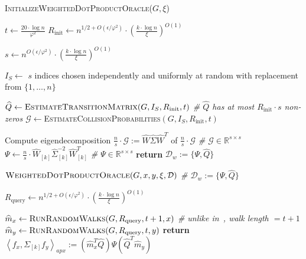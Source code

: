 \documentclass[letterpaper,11pt]{article}
\newcommand{\Q}{\widehat{Q}}
\newcommand{\m}{\widehat{m}}
\newcommand{\cD}{\mathcal{D}}
\newcommand{\G}{\mathcal{G}}
\newcommand{\R}{\mathbb{R}}
\theoremstyle{plain}
\theoremstyle{definition}
\theoremstyle{remark}
\newcommand{\adp}[1]
  {\ensuremath{\left\langle #1 \right\rangle_{\scriptscriptstyle apx}}}
\newcommand{\return}{\textbf{return }}
\begin{document}
\begin{algorithm}[H]
	\caption{\textsc{InitializeWeightedDotProductOracle($G,\xi$)}  
 } \label{alg:LearnEmbedding-tt}
\label{alg:LearnEmbedding}
\begin{algorithmic}[1]
	\STATE $t\gets \frac{20\cdot \log n}{\varphi^2}$	
\STATE $R_{\text{init}}\gets n^{1/2 + O(\epsilon / \varphi^2)} \cdot  \left(\frac{k\cdot \log n}{\xi}\right)^{O(1)}$	
	
	\STATE $s\gets n^{O(\epsilon / \varphi^2)} \cdot \left(\frac{k\cdot \log n}{\xi}\right)^{O(1)}$ \label{ln:sets} 
	
	\STATE  $I_S\gets $ $s$ indices chosen independently and uniformly at random with replacement from $\{1,\ldots,n\}$ \label{ln:sample}
	
\STATE ${\Q} \gets \textsc{EstimateTransitionMatrix}(G,I_S,R_{\text{init}},t)$  \textit{\qquad   \# $\Q$ has at most $R_{\text{init}}\cdot s$ non-zeros \label{ln:setQi}}
	\STATE $\G\gets$\textsc{EstimateCollisionProbabilities}$(G,I_S,R_{\text{init}},t)$ \label{ln:setG}

	\STATE Compute  eigendecomposition $\frac{n}{s}\cdot\G:=\widehat{W}\widehat{\Sigma} \widehat{W}^T$  of $\frac{n}{s}\cdot\G$ \textit{\qquad\qquad \qquad \qquad\qquad \# $\G\in \R^{s\times s}$ \label{ln:svdG}}
	\STATE $\Psi\gets \frac{n}{s}\cdot\widehat{W}_{[k]}\widehat{\Sigma}_{[k]}^{-2} \widehat{W}_{[k]}^T$ \textit{\qquad \qquad\qquad \qquad\qquad \qquad\qquad \qquad\qquad \qquad \qquad \qquad \# $\Psi\in\R^{s\times s}$} 
	\STATE \return   $\cD_w:=\{\Psi,\Q\}$
\end{algorithmic}
\end{algorithm}

\begin{algorithm}[H]
	\caption{$\textsc{WeightedDotProductOracle}(G,x,y,  \xi, \mathcal{D})$  \textit{\qquad \qquad  \# $\mathcal{D}_w:=\{\Psi,\Q\}$}
}
\label{alg:weighted-dot}
\begin{algorithmic}[1]
	\STATE $R_{\text{query}}\gets n^{1/2 + O(\epsilon / \varphi^2)} \cdot  \left(\frac{k\cdot \log n}{\xi}\right)^{O(1)}$
				
		\STATE ${\m_x\gets \textsc{RunRandomWalks}(G,R_{\text{query}},t+1,x)}$
		 \textit{\quad \# unlike in~\cite{GluchKLMS21},  walk length  $=t+1$}
		\STATE ${\m_y\gets \textsc{RunRandomWalks}(G,R_{\text{query}},t,y)}$ 
	\STATE  \return $\adp{f_{x},\Sigma_{[k]} f_y}:=(\m_x^T \Q) \Psi (\Q^T\m_y)$  
\end{algorithmic}
\end{algorithm}
\end{document}
